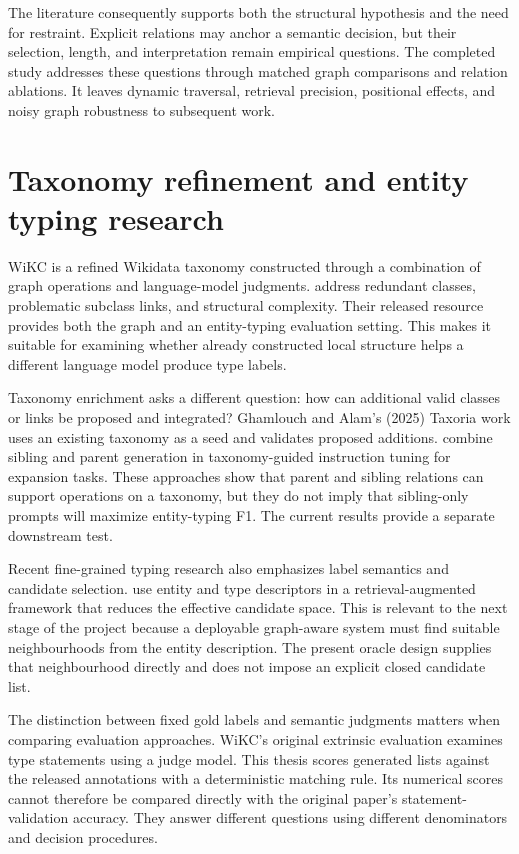 The literature consequently supports both the structural hypothesis and the need for restraint. Explicit relations may anchor a semantic decision, but their selection, length, and interpretation remain empirical questions. The completed study addresses these questions through matched graph comparisons and relation ablations. It leaves dynamic traversal, retrieval precision, positional effects, and noisy graph robustness to subsequent work.


\FloatBarrier

\section{Taxonomy refinement and entity typing research}

WiKC is a refined Wikidata taxonomy constructed through a combination of graph operations and language-model judgments. \citet{peng2024} address redundant classes, problematic subclass links, and structural complexity. Their released resource provides both the graph and an entity-typing evaluation setting. This makes it suitable for examining whether already constructed local structure helps a different language model produce type labels.


Taxonomy enrichment asks a different question: how can additional valid classes or links be proposed and integrated? Ghamlouch and Alam’s (2025) Taxoria work uses an existing taxonomy as a seed and validates proposed additions. \citet{shen2025} combine sibling and parent generation in taxonomy-guided instruction tuning for expansion tasks. These approaches show that parent and sibling relations can support operations on a taxonomy, but they do not imply that sibling-only prompts will maximize entity-typing F1. The current results provide a separate downstream test.


Recent fine-grained typing research also emphasizes label semantics and candidate selection. \citet{ma2026} use entity and type descriptors in a retrieval-augmented framework that reduces the effective candidate space. This is relevant to the next stage of the project because a deployable graph-aware system must find suitable neighbourhoods from the entity description. The present oracle design supplies that neighbourhood directly and does not impose an explicit closed candidate list.


The distinction between fixed gold labels and semantic judgments matters when comparing evaluation approaches. WiKC’s original extrinsic evaluation examines type statements using a judge model. This thesis scores generated lists against the released annotations with a deterministic matching rule. Its numerical scores cannot therefore be compared directly with the original paper’s statement-validation accuracy. They answer different questions using different denominators and decision procedures.


